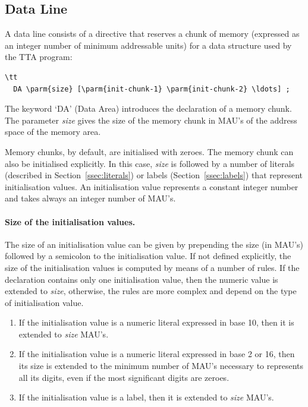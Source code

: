 \documentclass[twoside]{tceusermanual}
\begin{document}
\subsection{Data Line}
\label{ssec:data-line}

A data line consists of a directive that reserves a chunk of memory
(expressed as an integer number of minimum addressable units) for a data
structure used by the TTA program:

\begin{verbatim}\tt
  DA \parm{size} [\parm{init-chunk-1} \parm{init-chunk-2} \ldots] ;
\end{verbatim}

The keyword `DA' (Data Area) introduces the declaration of a memory chunk.
The parameter \emph{size} gives the size of the memory chunk in MAU's of the
address space of the memory area.

Memory chunks, by default, are initialised with zeroes. The memory chunk can
also be initialised explicitly. In this case, \emph{size} is followed by a
number of literals (described in Section~\ref{ssec:literals}) or labels
(Section~\ref{ssec:labels}) that represent initialisation values.
%
An initialisation value represents a constant integer number and takes
always an integer number of MAU's.

\paragraph{Size of the initialisation values.}
The size of an initialisation value can be given by prepending the size (in
MAU's) followed by a semicolon to the initialisation value.
%
If not defined explicitly, the size of the initialisation values is computed
by means of a number of rules. If the declaration contains only one
initialisation value, then the numeric value is extended to \emph{size},
otherwise, the rules are more complex and depend on the type of
initialisation value.

\begin{enumerate}
\item %
  If the initialisation value is a numeric literal expressed in base 10,
  then it is extended to \emph{size} MAU's.
\item %
  If the initialisation value is a numeric literal expressed in base 2 or
  16, then its size is extended to the minimum number of MAU's necessary to
  represents all its digits, even if the most significant digits are zeroes.
\item %
  If the initialisation value is a label, then it is extended to \emph{size}
  MAU's.
\end{enumerate}
\end{document}
